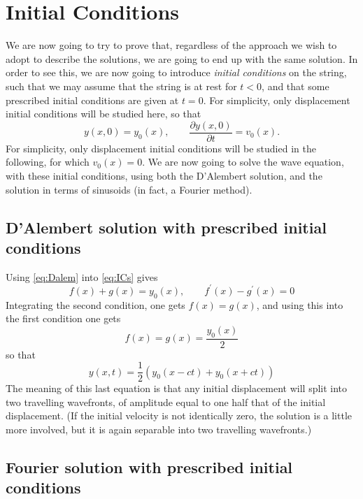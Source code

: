 \documentclass[11pt,twoside,a4paper,english]{book}
\begin{document}
\section{Initial Conditions}
We are now going to try to prove that, regardless of the approach we wish to adopt to describe the solutions, we are going to end up with the same solution. In order to see this, we are now going to introduce \emph{initial conditions} on the string, such that we may assume that the string is at rest for $t<0$, and that some prescribed initial conditions are given at $t=0$. For simplicity, only displacement initial conditions will be studied here, so that
\begin{equation}\label{eq:ICs}
y(x,0) = y_0(x), \qquad \frac{\partial y(x,0)}{\partial t} = v_0(x).
\end{equation}
For simplicity, only displacement initial conditions will be studied in the following, for which $v_0(x) = 0$. We are now going to solve the wave equation, with these initial conditions, using both the D'Alembert solution, and the solution in terms of sinusoids (in fact, a Fourier method). 


\subsection{D'Alembert solution with prescribed initial conditions}
Using \eqref{eq:Dalem} into \eqref{eq:ICs} gives
\begin{equation}
f(x)+g(x) = y_0(x), \qquad f^\prime(x) - g^\prime(x) = 0
\end{equation}
Integrating the second condition, one gets $f(x) = g(x)$, and using this into the first condition  one gets
\begin{equation}
f(x)=g(x)=\frac{y_0(x)}{2}
\end{equation}
so that
\begin{equation}\label{eq:Tr}
y(x,t) = \frac{1}{2}\left( y_0(x-ct) + y_0(x+ct)\right)
\end{equation}
The meaning of this last equation is that any initial displacement will split into two travelling wavefronts, of  amplitude equal to one half that of the initial displacement. (If the initial velocity is not identically zero, the solution is a little more involved, but it is again separable into two travelling wavefronts.)


\subsection{Fourier solution with prescribed initial conditions}
\end{document}
